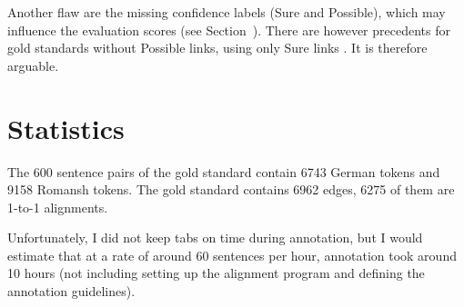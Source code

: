 Another flaw are the missing confidence labels (Sure and Possible), which may influence the evaluation scores (see Section~). 
There are however precedents for gold standards without Possible links, using only Sure links \autocites{clematide2018,mihalcea-pedersen-2003-evaluation}. It is therefore arguable.



\section{Statistics}
The 600 sentence pairs of the gold standard contain 6743 German tokens and 9158 Romansh tokens. 
The gold standard contains 6962 edges, 6275 of them are 1-to-1 alignments.

Unfortunately, I did not keep tabs on time during annotation, but I would estimate that at a rate of around 60 sentences per hour, annotation took around 10 hours (not including setting up the alignment program and defining the annotation guidelines). 

